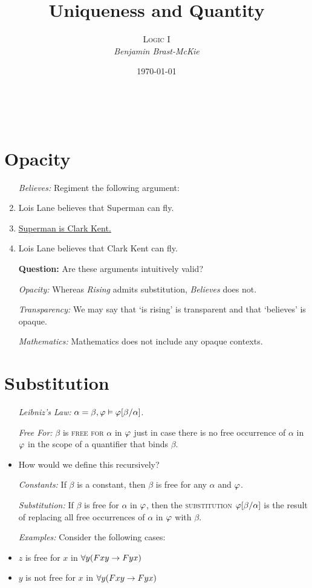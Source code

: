 \documentclass[a4paper, 11pt]{article} %
\title{\textbf{Uniqueness and Quantity}} %
\author{\textsc{Logic I}\\ \em Benjamin Brast-McKie} %
\date{\today} %
\makeatletter
\renewcommand{\maketitle}{
\begin{flushright}
{\LARGE\@title}

\vspace{10pt}

{\@author}
\\ \@date
\end{flushright}

\vspace{-20pt}

}
\makeatother
\begin{document}
\maketitle %

\thispagestyle{empty}



\section*{Opacity}

\begin{enumerate}
  \item[\it Believes:] Regiment the following argument:
    \item Lois Lane believes that Superman can fly.
    \item \underline{Superman is Clark Kent.\quad\quad}
    \item Lois Lane believes that Clark Kent can fly.
  \item[\bf Question:] Are these arguments intuitively valid?
  \item[\it Opacity:] Whereas \textit{Rising} admits substitution, \textit{Believes} does not.
  \item[\it Transparency:] We may say that `is rising' is transparent and that `believes' is opaque.
  \item[\it Mathematics:] Mathematics does not include any opaque contexts.
\end{enumerate}






\section*{Substitution}

\begin{itemize}
  \item[\it Leibniz's Law:] $\alpha = \beta, \varphi \vDash \varphi[\beta/\alpha]$.
  \item[\it Free For:] $\beta$ is \textsc{free for} $\alpha$ in $\varphi$ just in case there is no free occurrence of $\alpha$ in $\varphi$ in the scope of a quantifier that binds $\beta$. 
    \item How would we define this recursively?
  \item[\it Constants:] If $\beta$ is a constant, then $\beta$ is free for any $\alpha$ and $\varphi$. 
  \item[\it Substitution:] If $\beta$ is free for $\alpha$ in $\varphi$, then the \textsc{substitution} $\varphi[\beta/\alpha]$ is the result of replacing all free occurrences of $\alpha$ in $\varphi$ with $\beta$. 
  \item[\it Examples:] Consider the following cases:
    \item $z$ is free for $x$ in $\forall y(Fxy \rightarrow Fyx)$ 
    \item $y$ is not free for $x$ in $\forall y(Fxy \rightarrow Fyx)$
\end{itemize}
\end{document}

